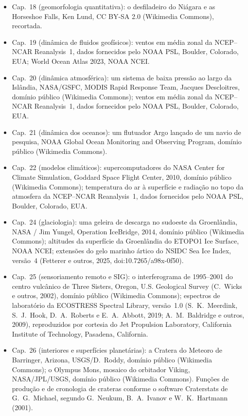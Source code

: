 \begin{itemize}
  \item Cap.~18 (geomorfologia quantitativa): o desfiladeiro do Niágara e as Horseshoe Falls, Ken Lund, CC BY-SA 2.0 (Wikimedia Commons), recortada.
  \item Cap.~19 (dinâmica de fluidos geofísicos): ventos em média zonal da NCEP--NCAR Reanalysis~1, dados fornecidos pelo NOAA PSL, Boulder, Colorado, EUA; World Ocean Atlas 2023, NOAA NCEI.
  \item Cap.~20 (dinâmica atmosférica): um sistema de baixa pressão ao largo da Islândia, NASA/GSFC, MODIS Rapid Response Team, Jacques Descloitres, domínio público (Wikimedia Commons); ventos em média zonal da NCEP--NCAR Reanalysis~1, dados fornecidos pelo NOAA PSL, Boulder, Colorado, EUA.
  \item Cap.~21 (dinâmica dos oceanos): um flutuador Argo lançado de um navio de pesquisa, NOAA Global Ocean Monitoring and Observing Program, domínio público (Wikimedia Commons).
  \item Cap.~22 (modelos climáticos): supercomputadores do NASA Center for Climate Simulation, Goddard Space Flight Center, 2010, domínio público (Wikimedia Commons); temperatura do ar à superfície e radiação no topo da atmosfera da NCEP--NCAR Reanalysis~1, dados fornecidos pelo NOAA PSL, Boulder, Colorado, EUA.
  \item Cap.~24 (glaciologia): uma geleira de descarga no sudoeste da Groenlândia, NASA / Jim Yungel, Operation IceBridge, 2014, domínio público (Wikimedia Commons); altitudes da superfície da Groenlândia do ETOPO1 Ice Surface, NOAA NCEI; extensões do gelo marinho ártico do NSIDC Sea Ice Index, versão~4 (Fetterer e outros, 2025, doi:10.7265/a98x-0f50).
  \item Cap.~25 (sensoriamento remoto e SIG): o interferograma de 1995--2001 do centro vulcânico de Three Sisters, Oregon, U.S. Geological Survey (C.~Wicks e outros, 2002), domínio público (Wikimedia Commons); espectros de laboratório da ECOSTRESS Spectral Library, versão~1.0 (S.~K.~Meerdink, S.~J.~Hook, D.~A.~Roberts e E.~A.~Abbott, 2019; A.~M.~Baldridge e outros, 2009), reproduzidos por cortesia do Jet Propulsion Laboratory, California Institute of Technology, Pasadena, California.
  \item Cap.~26 (interiores e superfícies planetárias): a Cratera do Meteoro de Barringer, Arizona, USGS/\allowbreak D.~Roddy, domínio público (Wikimedia Commons); o Olympus Mons, mosaico do orbitador Viking, NASA/\allowbreak JPL/\allowbreak USGS, domínio público (Wikimedia Commons). Funções de produção e de cronologia de crateras conforme o software Craterstats de G.~G.~Michael, segundo G.~Neukum, B.~A.~Ivanov e W.~K.~Hartmann (2001).

\end{itemize}

